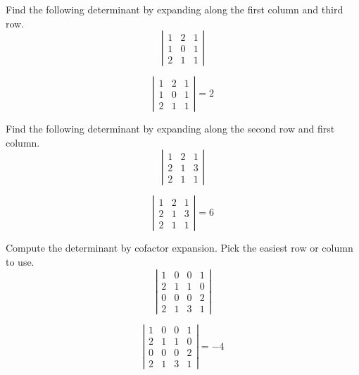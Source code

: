 \begin{enumialphparenastyle}
\begin{ex} Find the following determinant by expanding along the first column and
third row. 
\begin{equation*}
\left|
\begin{array}{rrr}
1 & 2 & 1 \\
1 & 0 & 1 \\
2 & 1 & 1
\end{array}
\right|
\end{equation*}
\begin{sol}
\[
\left|
\begin{array}{ccc}
1 & 2 & 1 \\
1 & 0 & 1 \\
2 & 1 & 1
\end{array}
\right| =  2
\]
\end{sol}
\end{ex}

\begin{ex} Find the following determinant by expanding along the second row and
first column. 
\begin{equation*}
\left|
\begin{array}{rrr}
1 & 2 & 1 \\
2 & 1 & 3 \\
2 & 1 & 1
\end{array}
\right|
\end{equation*}
\begin{sol}
\[
\left|
\begin{array}{ccc}
1 & 2 & 1 \\
2 & 1 & 3 \\
2 & 1 & 1
\end{array}
\right| = 6
\]
\end{sol}
\end{ex}

\begin{ex} Compute the determinant by cofactor expansion. Pick the easiest row or
column to use.
\begin{equation*}
\left|
\begin{array}{rrrr}
1 & 0 & 0 & 1 \\
2 & 1 & 1 & 0 \\
0 & 0 & 0 & 2 \\
2 & 1 & 3 & 1
\end{array}
\right|
\end{equation*}
\begin{sol}
\[
\left|
\begin{array}{cccc}
1 & 0 & 0 & 1 \\
2 & 1 & 1 & 0 \\
0 & 0 & 0 & 2 \\
2 & 1 & 3 & 1
\end{array}
\right| = -4
\]
\end{sol}
\end{ex}

\end{enumialphparenastyle}